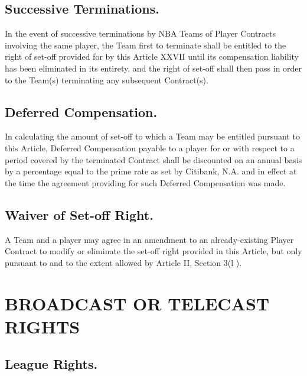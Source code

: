 \documentclass[
]{book}
\begin{document}
\hypertarget{successive-terminations.}{%
\section{Successive Terminations.}\label{successive-terminations.}}

In the event of successive terminations by NBA Teams of Player Contracts involving the same player, the Team first to terminate shall be entitled to the right of set-off provided for by this Article XXVII until its compensation liability has been eliminated in its entirety, and the right of set-off shall then pass in order to the Team(s) terminating any subsequent Contract(s).

\hypertarget{deferred-compensation.}{%
\section{Deferred Compensation.}\label{deferred-compensation.}}

In calculating the amount of set-off to which a Team may be entitled pursuant to this Article, Deferred Compensation payable to a player for or with respect to a period covered by the terminated Contract shall be discounted on an annual basis by a percentage equal to the prime rate as set by Citibank, N.A. and in effect at the time the agreement providing for such Deferred Compensation was made.

\hypertarget{waiver-of-set-off-right.}{%
\section{Waiver of Set-off Right.}\label{waiver-of-set-off-right.}}

A Team and a player may agree in an amendment to an already-existing Player Contract to modify or eliminate the set-off right provided in this Article, but only pursuant to and to the extent allowed by Article II, Section 3(l ).

\hypertarget{broadcast-or-telecast-rights}{%
\chapter{BROADCAST OR TELECAST RIGHTS}\label{broadcast-or-telecast-rights}}

\hypertarget{league-rights.}{%
\section{League Rights.}\label{league-rights.}}
\end{document}
